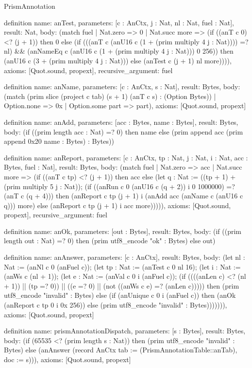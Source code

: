 \begin{lexlean}{PrismAnnotation}
\begin{semanticmodule}
definition{
  name: anTest,
  parameters: [c : AnCtx, j : Nat, nl : Nat, fuel : Nat],
  result: Nat,
  body: (match fuel
    | Nat.zero => 0
    | Nat.succ more => (if ((anT c 0) <? (j + 1)) then 0 else (if (((anT c (anU16 c (1 + (prim multiply 4 j : Nat)))) =? nl) && (anNameEq c (anU16 c (1 + (prim multiply 4 j : Nat))) 0 256)) then (anU16 c (3 + (prim multiply 4 j : Nat))) else (anTest c (j + 1) nl more)))),
  axioms: [Quot.sound, propext],
  recursive_argument: fuel
}

definition{
  name: anName,
  parameters: [c : AnCtx, s : Nat],
  result: Bytes,
  body: (match (prim slice (project c tab) (s + 1) (anT c s) : (Option Bytes))
    | Option.none => 0x
    | Option.some part => part),
  axioms: [Quot.sound, propext]
}

definition{
  name: anAdd,
  parameters: [acc : Bytes, name : Bytes],
  result: Bytes,
  body: (if ((prim length acc : Nat) =? 0) then name else (prim append acc (prim append 0x20 name : Bytes) : Bytes))
}

definition{
  name: anReport,
  parameters: [c : AnCtx, tp : Nat, j : Nat, i : Nat, acc : Bytes, fuel : Nat],
  result: Bytes,
  body: (match fuel
    | Nat.zero => acc
    | Nat.succ more => (if ((anT c tp) <? (j + 1)) then acc else (let q : Nat := ((tp + 1) + (prim multiply 5 j : Nat)); (if ((anRun c 0 (anU16 c (q + 2)) i 0 1000000) =? (anT c (q + 4))) then (anReport c tp (j + 1) i (anAdd acc (anName c (anU16 c q))) more) else (anReport c tp (j + 1) i acc more))))),
  axioms: [Quot.sound, propext],
  recursive_argument: fuel
}

definition{
  name: anOk,
  parameters: [out : Bytes],
  result: Bytes,
  body: (if ((prim length out : Nat) =? 0) then (prim utf8_encode "ok" : Bytes) else out)
}

definition{
  name: anAnswer,
  parameters: [c : AnCtx],
  result: Bytes,
  body: (let nl : Nat := (anNl c 0 (anFuel c)); (let tp : Nat := (anTest c 0 nl 16); (let i : Nat := (anWs c (nl + 1)); (let e : Nat := (anVal c 0 i (anFuel c)); (if ((((anLen c) <? (nl + 1)) || (tp =? 0)) || ((e =? 0) || (not ((anWs c e) =? (anLen c))))) then (prim utf8_encode "invalid" : Bytes) else (if (anUnique c 0 i (anFuel c)) then (anOk (anReport c tp 0 i 0x 256)) else (prim utf8_encode "invalid" : Bytes))))))),
  axioms: [Quot.sound, propext]
}

definition{
  name: prismAnnotationDispatch,
  parameters: [s : Bytes],
  result: Bytes,
  body: (if (65535 <? (prim length s : Nat)) then (prim utf8_encode "invalid" : Bytes) else (anAnswer (record AnCtx {tab := (PrismAnnotationTable::anTab), doc := s}))),
  axioms: [Quot.sound, propext]
}
\end{semanticmodule}
\end{lexlean}
